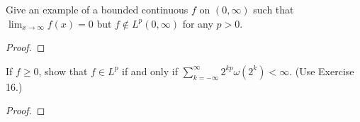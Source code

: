 \begin{problem}
Give an example of a bounded continuous $f$ on $(0,\infty)$ such that
$\lim_{x\to\infty}f(x)=0$ but $f\notin L^p(0,\infty)$ for any $p>0$.
\end{problem}
\begin{proof}
\end{proof}
\newpage

\begin{problem}
If $f\geq 0$, show that $f\in L^p$ if and only if $\sum_{k=-\infty}^\infty
2^{kp}\omega(2^k)<\infty$. (Use Exercise 16.)
\end{problem}
\begin{proof}
\end{proof}


